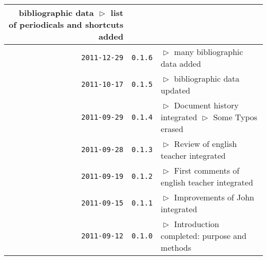 \begin{table}
\begin{center}
\begin{tabular}{|r|c|p{10cm}|}
  bibliographic data \newline 
  $\vartriangleright$ list of periodicals and shortcuts added\\
\hline
    \texttt{2011-12-29}
  & \texttt{0.1.6} 
  & $\vartriangleright$ many bibliographic data added\\
\hline
    \texttt{2011-10-17}
  & \texttt{0.1.5} 
  & $\vartriangleright$ bibliographic data updated\\
\hline
    \texttt{2011-09-29}
  & \texttt{0.1.4} 
  & $\vartriangleright$ Document history integrated\newline
    $\vartriangleright$ Some Typos erased\\
\hline
    \texttt{2011-09-28}
  & \texttt{0.1.3} 
  & $\vartriangleright$ Review of english teacher integrated \\
\hline
    \texttt{2011-09-19}
  & \texttt{0.1.2} 
  & $\vartriangleright$ First comments of english teacher integrated \\
\hline
    \texttt{2011-09-15}
  & \texttt{0.1.1} 
  & $\vartriangleright$ Improvements of John integrated\\
\hline
    \texttt{2011-09-12}
  & \texttt{0.1.0} 
  & $\vartriangleright$ Introduction completed: purpose and methods \\
\hline
\hline 
\end{tabular}
\end{center}
\end{table}


%
